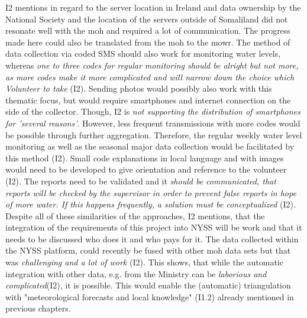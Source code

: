 I2 mentions in regard to the server location in Ireland and data ownership by the National Society and the location of the servers outside of Somaliland did not resonate well with the \acrshort{moh} and required a lot of communication. The progress made here could also be translated from the \acrshort{moh} to the \acrshort{mowr}.\newline
The method of data collection via coded SMS should also work for monitoring water levels, whereas \textit{one to three codes for regular monitoring should be alright but not more, as more codes make it more complicated and will narrow down the choice which Volunteer to take} (I2). Sending photos would possibly also work with this thematic focus, but would require smartphones and internet connection on the side of the collector. Though, I2 is \textit{not supporting the distribution of smartphones for 'several reasons'}. However, less frequent transmissions with more codes would be possible through further aggregation. Therefore, the regular weekly water level monitoring as well as the seasonal major data collection would be facilitated by this method (I2). Small code explanations in local language and with images would need to be developed to give orientation and reference to the volunteer (I2).\newline
The reports need to be validated and it \textit{should be communicated, that reports will be checked by the supervisor in order to prevent false reports in hope of more water. If this happens frequently, a solution must be conceptualized} (I2). Despite all of these similarities of the approaches, I2 mentions, that the integration of the requirements of this project into NYSS will be work and that it needs to be discussed who does it and who pays for it.\newline
The data collected within the NYSS platform, could recently be fused with other \acrshort{moh} data sets but that was \textit{challenging and a lot of work} (I2). This shows, that while the automatic integration with other data, e.g. from the Ministry can be \textit{laborious and complicated}(I2), it is possible. This would enable the (automatic) triangulation with "meteorological forecasts and local knowledge" (I1.2) already mentioned in previous chapters.


